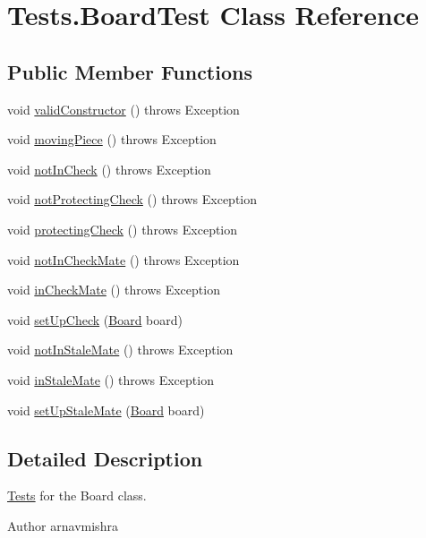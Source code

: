 \hypertarget{class_tests_1_1_board_test}{}\section{Tests.\+Board\+Test Class Reference}
\label{class_tests_1_1_board_test}
\subsection*{Public Member Functions}
\begin{DoxyCompactItemize}
\item 
void \hyperlink{class_tests_1_1_board_test_a7a85d67a559913d4e5a3b0977daa5309}{valid\+Constructor} ()  throws Exception 
\item 
void \hyperlink{class_tests_1_1_board_test_acd51124659fb2a0eb4f6fcc9b41e8001}{moving\+Piece} ()  throws Exception 
\item 
void \hyperlink{class_tests_1_1_board_test_a929e0f87bd865f7fdf810ab37768f4e8}{not\+In\+Check} ()  throws Exception 
\item 
void \hyperlink{class_tests_1_1_board_test_aa5b9e4cbefe4702bcd89fbc9ee886a29}{not\+Protecting\+Check} ()  throws Exception 
\item 
void \hyperlink{class_tests_1_1_board_test_a59084580ebe6a2c112887b13c1fa63ee}{protecting\+Check} ()  throws Exception 
\item 
void \hyperlink{class_tests_1_1_board_test_a2e13dc59ccbbdb6535ed634b612b2fb1}{not\+In\+Check\+Mate} ()  throws Exception 
\item 
void \hyperlink{class_tests_1_1_board_test_a39bdcd7eb309f039104f07d042d0678f}{in\+Check\+Mate} ()  throws Exception 
\item 
void \hyperlink{class_tests_1_1_board_test_a33895f492ce1d7dfba81b325fa351da0}{set\+Up\+Check} (\hyperlink{class_framework_1_1_board}{Board} board)
\item 
void \hyperlink{class_tests_1_1_board_test_a403efc830e97a274bc65ea131dfb0e5f}{not\+In\+Stale\+Mate} ()  throws Exception 
\item 
void \hyperlink{class_tests_1_1_board_test_aaa8c24159f5ef9acbb15b47ae83f8d88}{in\+Stale\+Mate} ()  throws Exception 
\item 
void \hyperlink{class_tests_1_1_board_test_a6e66cbfe15e55e7f65f37a85fd8126b2}{set\+Up\+Stale\+Mate} (\hyperlink{class_framework_1_1_board}{Board} board)
\end{DoxyCompactItemize}


\subsection{Detailed Description}
\hyperlink{namespace_tests}{Tests} for the Board class. \begin{DoxyAuthor}{Author}
arnavmishra 
\end{DoxyAuthor}


